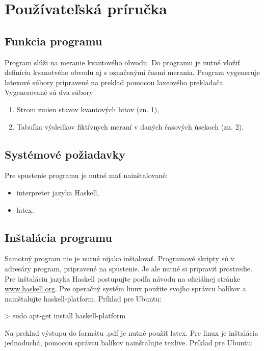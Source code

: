 
\chapter{Používateľská príručka}

\section{Funkcia programu}

Program slúži na meranie kvantového obvodu. Do programu je nutné vložiť 
definíciu kvanotvého obvodu aj s označenými časmi merania. Program vygeneruje
latexové súbory pripravené na preklad pomocou laxeového prekladača. 
Vygenerované sú dva súbory
\begin{enumerate}
    \item Strom zmien stavov kvantových bitov (zn. 1),
    \item Tabuľka výsledkov fiktívnych meraní v daných časových úsekoch (zn. 2).
\end{enumerate}

\section{Systémové požiadavky}

Pre spustenie programu je nutné mať nainštalované: 
\begin{itemize}
    \item interpreter jazyka Haskell,
    \item latex.
\end{itemize}

\section{Inštalácia programu}

Samotný program nie je nutné nijako inštalovať. Programové skripty sú v 
adresáry program, pripravené na spustenie. Je ale nutné si pripraviť prostredie.
Pre inštaláciu jazyka Haskell postupujte podľa návodu na oficiálnej 
stránke \url{www.haskell.org}. Pre operačný systém linux použite svojho
správcu balíkov a nainštalujte haskell-platform. Príklad pre Ubuntu:

\begin{code}
> sudo apt-get install haskell-platform
\end{code}

Na preklad výstupu do formátu .pdf je nutné použiť latex. Pre linux je
inštalácia jednoduchá, pomocou správcu balíkov nainštalujte texlive. Príklad
pre Ubuntu:

